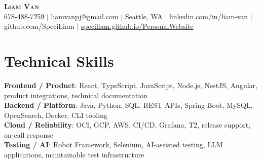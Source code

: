 \documentclass[letterpaper,11pt]{article}
\begin{document}

%
\begin{center}
    \textbf{\Huge \scshape Liam Van} \\ \vspace{1pt}
    \small 678-488-7259 $|$ \small {liamvanpj@gmail.com} $|$ Seattle, WA
 {{$|$ linkedin.com/in/liam-van} {$|$ github.com/SpeciLiam} {$|$ \href{https://speciliam.github.io/PersonalWebsite}{speciliam.github.io/PersonalWebsite}}}

\end{center}

\section{Technical Skills}
 \begin{itemize}[leftmargin=0.15in, label={}]
    \small{\item{
     \textbf{Frontend / Product}{: React, TypeScript, JavaScript, Node.js, NestJS, Angular, product integrations, technical documentation} \\
     \textbf{Backend / Platform}{: Java, Python, SQL, REST APIs, Spring Boot, MySQL, OpenSearch, Docker, CLI tooling} \\
     \textbf{Cloud / Reliability}{: OCI, GCP, AWS, CI/CD, Grafana, T2, release support, on-call response} \\
     \textbf{Testing / AI}{: Robot Framework, Selenium, AI-assisted testing, LLM applications, maintainable test infrastructure} \\
    }}
 \end{itemize}
%
\end{document}
